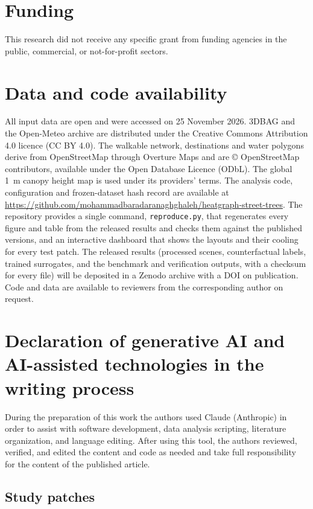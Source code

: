\documentclass[preprint,12pt,authoryear]{elsarticle}
\begin{document}
\section*{Funding}
This research did not receive any specific grant from funding agencies in the public, commercial, or not-for-profit sectors.

\section*{Data and code availability}
All input data are open and were accessed on 25 November 2026. 3DBAG and the Open-Meteo archive are distributed under the Creative Commons Attribution 4.0 licence (CC BY 4.0). The walkable network, destinations and water polygons derive from OpenStreetMap through Overture Maps and are \copyright{} OpenStreetMap contributors, available under the Open Database Licence (ODbL). The global 1~m canopy height map is used under its providers' terms. The analysis code, configuration and frozen-dataset hash record are available at \url{https://github.com/mohammadbaradaranaghghaleh/heatgraph-street-trees}. The repository provides a single command, \texttt{reproduce.py}, that regenerates every figure and table from the released results and checks them against the published versions, and an interactive dashboard that shows the layouts and their cooling for every test patch. The released results (processed scenes, counterfactual labels, trained surrogates, and the benchmark and verification outputs, with a checksum for every file) will be deposited in a Zenodo archive with a DOI on publication. Code and data are available to reviewers from the corresponding author on request.

\section*{Declaration of generative AI and AI-assisted technologies in the writing process}
During the preparation of this work the authors used Claude (Anthropic) in order to assist with software development, data analysis scripting, literature organization, and language editing. After using this tool, the authors reviewed, verified, and edited the content and code as needed and take full responsibility for the content of the published article.




\clearpage
\appendix
\setcounter{table}{0}
\begin{landscape}
\section{Study patches}\label{app:patches}

\end{landscape}
\restoregeometry
\end{document}

